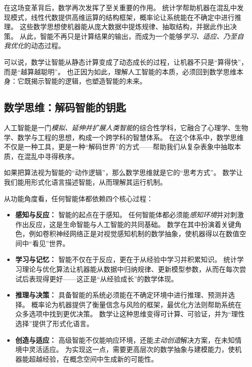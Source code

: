 在这场变革背后，数学再次发挥了至关重要的作用。
统计学帮助机器在混乱中发现模式，线性代数提供高维运算的结构框架，概率论让系统能在不确定中进行推理。
这些数学思想使机器能从庞大数据中提炼规律、抽取结构，并据此作出决策。
从此，智能不再只是计算结果的输出，而成为一个能够\emph{学习、适应、乃至自我优化}的动态过程。

可以说，数学让智能从静态计算变成了动态成长的过程，让机器不只是“算得快”，而是“越算越聪明”。
也正因为如此，理解人工智能的本质，必须回到数学思维本身：它既揭示智能的逻辑，也塑造智能的未来。

\subsection{数学思维：解码智能的钥匙}
人工智能是一门\emph{模拟、延伸并扩展人类智能}的综合性学科，它融合了心理学、生物学、数学与工程的思想，构成一个跨学科的智慧体系。
在这个体系中，数学思维不仅是一种工具，更是一种“解码世界”的方式——帮助我们从复杂表象中抽取本质，在混乱中寻得秩序。

如果把算法视为智能的“动作逻辑”，那么数学思维就是它的“思考方式”。
数学让我们能用形式化语言描述智能，从而理解其运行机制。

从功能角度看，任何智能体都依赖四个核心过程：

\begin{itemize}
\item \textbf{感知与反应：} 智能的起点在于感知。  
任何智能体都必须能\emph{感知环境}并对刺激作出反应，这是生命智能与人工智能的共同基础。  
数学在其中扮演着关键角色，例如卷积神经网络正是对视觉感知机制的数学抽象，使机器得以在数值空间中“看见”世界。

\item \textbf{学习与记忆：} 智能不仅在于反应，更在于从经验中学习并积累知识。  
统计学习理论与优化算法让机器能从数据中归纳规律、更新模型参数，从而在每次尝试后表现得更好——这正是“从经验成长”的数学体现。

\item \textbf{推理与决策：} 具备智能的系统必须能在不确定环境中进行推理、预测并选择。
概率论为机器提供了衡量信念与风险的框架，最优化方法则帮助系统在众多选项中找到更优决策。
数学让这种思维变得可计算、可验证，并为“理性选择”提供了形式化语言。

\item \textbf{创造与适应：} 高级智能不仅能响应环境，还能\emph{主动创造}解决方案，在未知情境中灵活适应。  
为实现这一点，需要更高层次的数学抽象与建模能力，使机器能超越经验，在概念空间中生成新的可能性。
\end{itemize}

